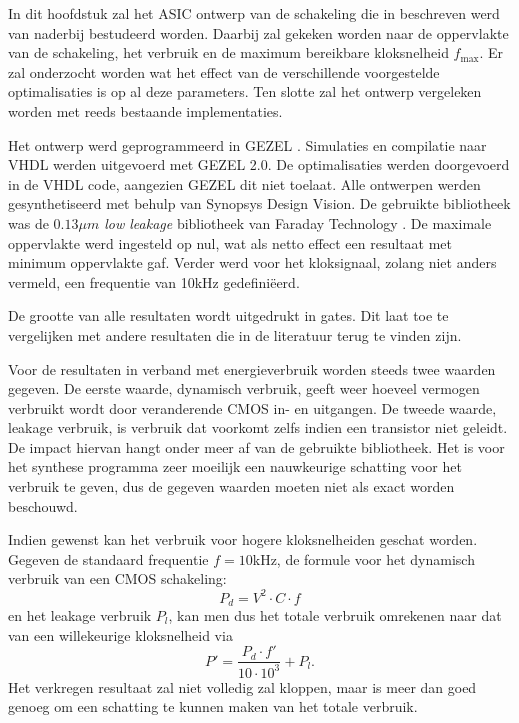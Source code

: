 
In dit hoofdstuk zal het ASIC ontwerp van de schakeling die in  beschreven werd van naderbij bestudeerd worden. Daarbij zal gekeken worden naar de oppervlakte van de schakeling, het verbruik en de maximum bereikbare kloksnelheid $f_{\text{max}}$. Er zal onderzocht worden wat het effect van de verschillende voorgestelde optimalisaties is op al deze parameters. Ten slotte zal het ontwerp vergeleken worden met reeds bestaande implementaties.

Het ontwerp werd geprogrammeerd in GEZEL \cite{gezel}. Simulaties en compilatie naar VHDL werden uitgevoerd met GEZEL 2.0. De optimalisaties werden doorgevoerd in de VHDL code, aangezien GEZEL dit niet toelaat. Alle ontwerpen werden gesynthetiseerd met behulp van Synopsys Design Vision. De gebruikte bibliotheek was de \emph{$0.13 \mu m$ low leakage} bibliotheek van Faraday Technology \cite{cell-databook}. De maximale oppervlakte werd ingesteld op nul, wat als netto effect een resultaat met minimum oppervlakte gaf. Verder werd voor het kloksignaal, zolang niet anders vermeld, een frequentie van 10kHz gedefini\"eerd.

De grootte van alle resultaten wordt uitgedrukt in gates. Dit laat toe te vergelijken met andere resultaten die in de literatuur terug te vinden zijn.

Voor de resultaten in verband met energieverbruik worden steeds twee waarden gegeven. De eerste waarde, dynamisch verbruik, geeft weer hoeveel vermogen verbruikt wordt door veranderende CMOS in- en uitgangen. De tweede waarde, leakage verbruik, is verbruik dat voorkomt zelfs indien een transistor niet geleidt. De impact hiervan hangt onder meer af van de gebruikte bibliotheek. Het is voor het synthese programma zeer moeilijk een nauwkeurige schatting voor het verbruik te geven, dus de gegeven waarden moeten niet als exact worden beschouwd.


Indien gewenst kan het verbruik voor hogere kloksnelheiden geschat worden. Gegeven de standaard frequentie $f = 10$kHz, de formule voor het dynamisch verbruik van een CMOS schakeling:
\[P_d = V^2 \cdot C \cdot f\]
en het leakage verbruik $P_l$, kan men dus het totale verbruik omrekenen naar dat van een willekeurige kloksnelheid via
\[P' = \frac{P_d \cdot f'}{10 \cdot 10^3} + P_l.\]
Het verkregen resultaat zal niet volledig zal kloppen, maar is meer dan goed genoeg om een schatting te kunnen maken van het totale verbruik.

